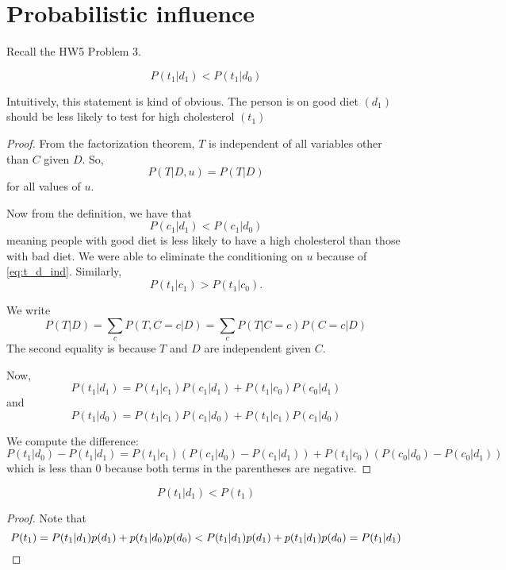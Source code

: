 \documentclass{discussion}
\begin{document}


\section{Probabilistic influence}

Recall the HW5 Problem 3. 

\begin{lemma} 
\[P(t_1 | d_1) < P(t_1 | d_0)\]
\end{lemma}
Intuitively, this statement is kind of obvious. The person is on good diet $(d_1)$ should be less likely to test for high cholesterol $(t_1)$
\begin{proof}
From the factorization theorem, $T$ is independent of all variables other than $C$ given $D$. So, 
\begin{equation}
\label{eq:t_d_ind}
	P(T | D, u) = P(T | D)
\end{equation} for all values of $u$.

Now from the definition, we have that
\begin{equation}
	P(c_1 | d_1) < P(c_1 | d_0)
\end{equation}
meaning people with good diet is less likely to have a high cholesterol than those with bad diet. We were able to eliminate the conditioning on $u$ because of \eqref{eq:t_d_ind}.
Similarly,
\[P(t_1 | c_1) > P(t_1 | c_0).\]

We write
\[P(T | D) = \sum_{c} P(T, C = c | D) = \sum_{c} P(T| C = c) P(C = c | D)
\]
The second equality is because $T$ and $D$ are independent given $C$.

Now,
\[
P(t_1 | d_1) = P(t_1 | c_1) P(c_1 | d_1) +P(t_1 | c_0) P(c_0 | d_1)
\] 
and
\[P(t_1 | d_0) = P(t_1 | c_1) P(c_1 | d_0)
+P(t_1 | c_1) P(c_1 | d_0)
\]

We compute the difference:
\[P(t_1 | d_0) - P(t_1 | d_1) 
= P(t_1 | c_1) (P(c_1 | d_0) - P(c_1 | d_1))
+ P(t_1 | c_0) (P(c_0 | d_0) - P(c_0 | d_1))
\]
which is less than 0 because both terms in the parentheses are negative.
\end{proof}

\begin{corollary}
\[	P(t_1 | d_1) < P(t_1)\]
\end{corollary}
\begin{proof}
	Note that 
	\[P(t_1) = P(t_1 | d_1) p(d_1) + p(t_1 | d_0) p(d_0) < P(t_1 | d_1) p(d_1) + p(t_1 | d_1) p(d_0) = P(t_1 | d_1)\qedhere\]
\end{proof}
\end{document}
